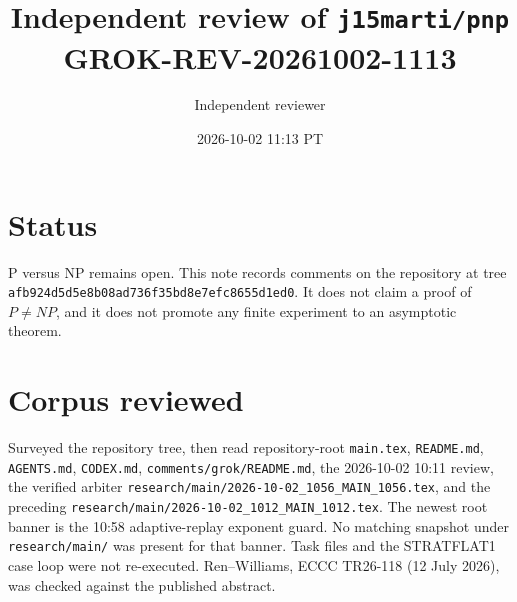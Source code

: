 \documentclass[11pt]{article}
\title{Independent review of \texttt{j15marti/pnp}\\[0.3em]
\large GROK-REV-20261002-1113}
\author{Independent reviewer}
\date{2026-10-02 11:13 PT}
\begin{document}
\maketitle

\section*{Status}
P versus NP remains open. This note records comments on the repository at tree
\texttt{afb924d5d5e8b08ad736f35bd8e7efc8655d1ed0}. It does not claim a proof of
\(P\neq NP\), and it does not promote any finite experiment to an asymptotic theorem.

\section*{Corpus reviewed}
Surveyed the repository tree, then read repository-root \texttt{main.tex},
\texttt{README.md}, \texttt{AGENTS.md}, \texttt{CODEX.md},
\texttt{comments/grok/README.md}, the 2026-10-02 10:11 review, the verified arbiter
\texttt{research/main/2026-10-02\_1056\_MAIN\_1056.tex}, and the preceding
\texttt{research/main/2026-10-02\_1012\_MAIN\_1012.tex}.
The newest root banner is the 10:58 adaptive-replay exponent guard. No matching
snapshot under \texttt{research/main/} was present for that banner.
Task files and the STRATFLAT1 case loop were not re-executed.
Ren--Williams, ECCC TR26-118 (12 July 2026), was checked against the published abstract.
\end{document}
